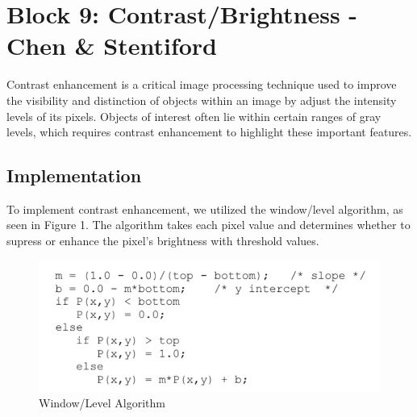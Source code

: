 
\section{Block 9: Contrast/Brightness - Chen \& Stentiford}

Contrast enhancement is a critical image processing technique used to improve the visibility and
distinction of objects within an image by adjust the intensity levels of its pixels. Objects of
interest often lie within certain ranges of gray levels, which requires contrast enhancement to
highlight these important features.


\subsection{Implementation}

To implement contrast enhancement, we utilized the window/level algorithm, as seen in Figure 1.
The algorithm takes each pixel value and determines whether to supress or enhance the pixel's
brightness with threshold values.

\begin{figure}[H]
    \centering
    \includegraphics[width=0.5\linewidth]{figures/windowlevelalgorithm.png}
    \caption{Window/Level Algorithm}
    \label{fig:window/levelalgorithm}
\end{figure}


